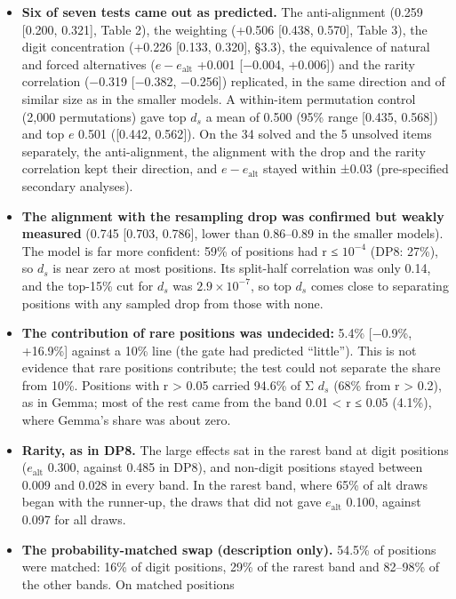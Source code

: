 \documentclass[
  10pt,
  a4paper,
]{article}
\providecommand{\tightlist}{%
  \setlength{\itemsep}{0pt}\setlength{\parskip}{0pt}}
\begin{document}
\begin{itemize}
\tightlist
\item
  \textbf{Six of seven tests came out as predicted.} The anti-alignment (0.259 {[}0.200, 0.321{]}, Table 2), the weighting (+0.506 {[}0.438, 0.570{]}, Table 3), the digit concentration (+0.226
  {[}0.133, 0.320{]}, §3.3), the equivalence of natural and forced alternatives (\(e - e_{\mathrm{alt}}\) +0.001 {[}−0.004, +0.006{]}) and the rarity correlation (−0.319 {[}−0.382, −0.256{]})
  replicated, in the same direction and of similar size as in the smaller models. A within-item permutation control (2,000 permutations) gave top \(d_{s}\) a mean of 0.500 (95\% range {[}0.435,
  0.568{]}) and top \(e\) 0.501 ({[}0.442, 0.562{]}). On the 34 solved and the 5 unsolved items separately, the anti-alignment, the alignment with the drop and the rarity correlation kept their
  direction, and \(e - e_{\mathrm{alt}}\) stayed within ±0.03 (pre-specified secondary analyses).
\item
  \textbf{The alignment with the resampling drop was confirmed but weakly measured} (0.745 {[}0.703, 0.786{]}, lower than 0.86--0.89 in the smaller models). The model is far more confident: 59\% of
  positions had r ≤ \(10^{-4}\) (DP8: 27\%), so \(d_{s}\) is near zero at most positions. Its split-half correlation was only 0.14, and the top-15\% cut for \(d_{s}\) was \(2.9\times 10^{-7}\), so top
  \(d_{s}\) comes close to separating positions with any sampled drop from those with none.
\item
  \textbf{The contribution of rare positions was undecided:} 5.4\% {[}−0.9\%, +16.9\%{]} against a 10\% line (the gate had predicted ``little''). This is not evidence that rare positions contribute;
  the test could not separate the share from 10\%. Positions with r \textgreater{} 0.05 carried 94.6\% of Σ \(d_{s}\) (68\% from r \textgreater{} 0.2), as in Gemma; most of the rest came from the band
  0.01 \textless{} r ≤ 0.05 (4.1\%), where Gemma's share was about zero.
\item
  \textbf{Rarity, as in DP8.} The large effects sat in the rarest band at digit positions (\(e_{\mathrm{alt}}\) 0.300, against 0.485 in DP8), and non-digit positions stayed between 0.009 and 0.028 in
  every band. In the rarest band, where 65\% of alt draws began with the runner-up, the draws that did not gave \(e_{\mathrm{alt}}\) 0.100, against 0.097 for all draws.
\item
  \textbf{The probability-matched swap (description only).} 54.5\% of positions were matched: 16\% of digit positions, 29\% of the rarest band and 82--98\% of the other bands. On matched positions

\end{itemize}
\end{document}

